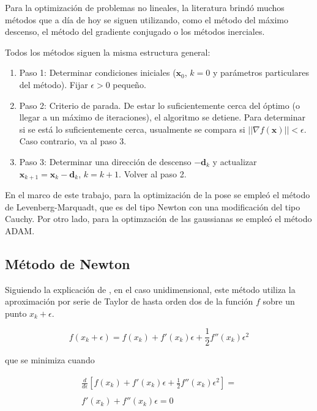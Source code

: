 Para la optimización de problemas no lineales, la literatura brindó muchos métodos que a día de hoy se siguen utilizando, como el método del máximo descenso, el método del gradiente conjugado o los métodos inerciales. 

Todos los métodos siguen la misma estructura general:

\begin{enumerate}
\item Paso 1: Determinar condiciones iniciales ($\mathbf{x}_0$, $k=0$ y parámetros particulares del método). Fijar $\epsilon > 0$ pequeño.

\item Paso 2: Criterio de parada. De estar lo suficientemente cerca del óptimo (o llegar a un máximo de iteraciones), el algoritmo se detiene. Para determinar si se está lo suficientemente cerca, usualmente se compara si $||\nabla{f(\mathbf{x})}|| < \epsilon$. Caso contrario, va al paso 3.

\item Paso 3: Determinar una dirección de descenso $-\mathbf{d}_k$ y actualizar $\mathbf{x}_{k+1} = \mathbf{x}_k - \mathbf{d}_k$, $k= k + 1$. Volver al paso 2.
\end{enumerate}

En el marco de este trabajo, para la optimización de la pose se empleó el método de Levenberg-Marquadt, que es del tipo Newton con una modificación del tipo Cauchy. Por otro lado, para la optimzación de las gaussianas se empleó el método ADAM.



\subsection{Método de Newton}


Siguiendo la explicación de \cite{GarciaVentura2023}, en el caso unidimensional, este método utiliza la aproximación por serie de Taylor de hasta orden dos de la función $f$ sobre un punto $x_{k}+\epsilon$.

\begin{equation}
    f(x_{k}+\epsilon) = f(x_k) + f'(x_k) \epsilon + \frac{1}{2} f''(x_k) \epsilon^2
\end{equation}

\noindent que se minimiza cuando

\begin{equation}
\begin{split}    
\frac{d}{d\epsilon}[f(x_k) + f'(x_k) \epsilon + \frac{1}{2} f''(x_k) \epsilon^2] = \\\\
f'(x_k) + f''(x_k) \epsilon = 0
\end{split}
\end{equation}

